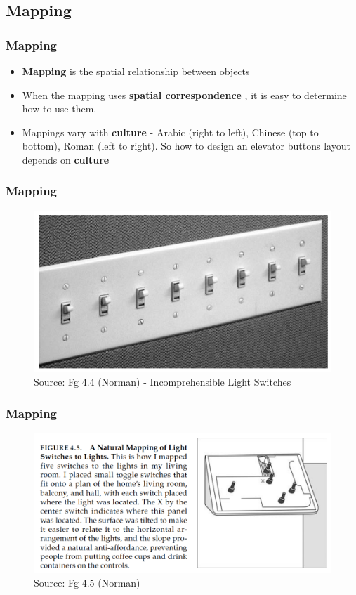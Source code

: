 \documentclass{beamer}
\begin{document}
\subsection{Mapping}

\begin{frame}
\frametitle{Mapping}
\begin{itemize}
	\item \textbf{Mapping} is the spatial relationship between objects
	\item When the mapping uses\textbf{ spatial correspondence }, it is easy to determine how to use them.
	\item Mappings vary with \textbf{culture} - Arabic (right to left), Chinese (top to bottom), Roman (left to right).  So how to design an elevator buttons layout depends on \textbf{culture}
\end{itemize}
\end{frame}


\begin{frame}
\frametitle{Mapping}
\centering
\begin{figure}
	\includegraphics[width=0.8\linewidth]{badswitches}
	\caption{Source: Fg 4.4 (Norman) - Incomprehensible Light Switches}
\end{figure}
\end{frame}


\begin{frame}
\frametitle{Mapping}
\centering
\begin{figure}
	\includegraphics[width=1\linewidth]{goodswitches}
	\caption{Source: Fg 4.5 (Norman)}
\end{figure}
\end{frame}
\end{document}
